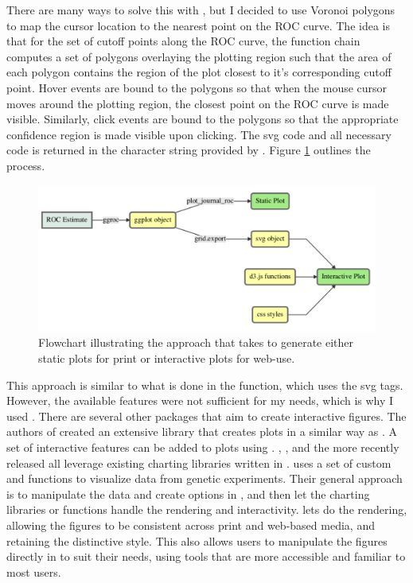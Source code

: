 \documentclass[codesnippet]{jss}
\begin{document}
There are many ways to solve this with , but I decided to use
Voronoi polygons to map the cursor location to the nearest point on the
ROC curve. The idea is that for the set of cutoff points along the ROC
curve, the  function chain computes a set of
polygons overlaying the plotting region such that the area of each
polygon contains the region of the plot closest to it's corresponding
cutoff point. Hover events are bound to the polygons so that when the
mouse cursor moves around the plotting region, the closest point on the
ROC curve is made visible. Similarly, click events are bound to the
polygons so that the appropriate confidence region is made visible upon
clicking. The svg code and all necessary  code is
returned in the character string provided by
. Figure \ref{flow} outlines the
 process.

\begin{figure}[ht]
\centering
\includegraphics{figure/diagram.pdf}
\caption{Flowchart illustrating the approach that  takes to generate either static plots for print or interactive plots for web-use. \label{flow}}
\end{figure}

This approach is similar to what is done in the 
 function, which uses the svg 
tags. However, the available features were not sufficient for my needs,
which is why I used . There are several other 
packages that aim to create interactive figures. The authors of
 \citep{animint} created an extensive 
library that creates plots in a similar way as . A set of
interactive features can be added to plots using .
 \citep{ggvis},  \citep{rcharts}, and the more
recently released  \citep{htmlwidgets} all leverage
existing charting libraries written in .
 \citep{qtlcharts} uses a set of custom
 and  functions to visualize data from
genetic experiments. Their general approach is to manipulate the data
and create options in , and then let the charting libraries
or functions handle the rendering and interactivity.  lets
 do the rendering, allowing the figures to be consistent
across print and web-based media, and retaining the distinctive
 style. This also allows users to manipulate the figures
directly in  to suit their needs, using tools that are more
accessible and familiar to most  users.
\end{document}
